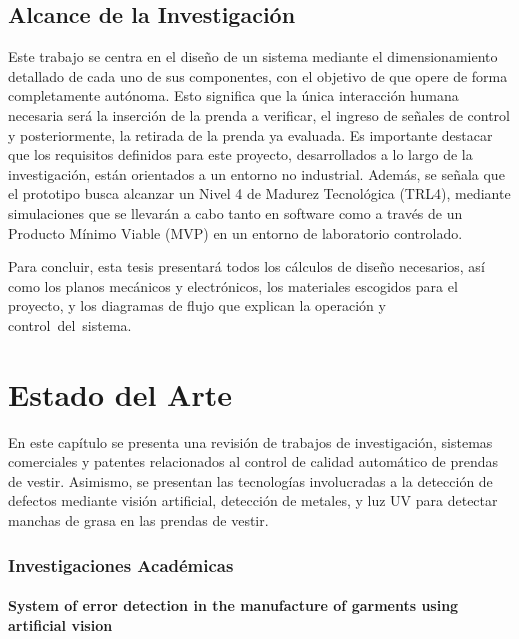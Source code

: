 \section{Alcance de la Investigación}

Este trabajo se centra en el diseño de un sistema mediante el dimensionamiento detallado de cada uno de sus componentes, con el objetivo de que opere de forma completamente autónoma. Esto significa que la única interacción humana necesaria será la inserción de la prenda a verificar, el ingreso de señales de control y posteriormente, la retirada de la prenda ya evaluada. Es importante destacar que los requisitos definidos para este proyecto, desarrollados a lo largo de la investigación, están orientados a un entorno no industrial. Además, se señala que el prototipo busca alcanzar un Nivel 4 de Madurez Tecnológica (TRL4), mediante simulaciones que se llevarán a cabo tanto en software como a través de un Producto Mínimo Viable (MVP) en un entorno de laboratorio controlado.

Para concluir, esta tesis presentará todos los cálculos de diseño necesarios, así como los planos mecánicos y electrónicos, los materiales escogidos para el proyecto, y los diagramas de flujo que explican la operación y control del sistema.

\chapter{Estado del Arte}
\label{Estado del Arte}
En este capítulo se presenta una revisión de trabajos de investigación, sistemas comerciales y patentes relacionados al control de calidad automático de prendas de vestir. Asimismo, se presentan las tecnologías involucradas a la detección de defectos mediante visión artificial, detección de metales, y luz UV para detectar manchas de grasa en las prendas de vestir.


\subsection{Investigaciones Académicas}

\subsubsection{System of error detection in the manufacture of garments using artificial vision}

